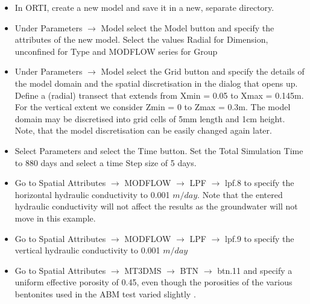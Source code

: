 \begin{itemize}

\item In ORTI, create a new model and save it in a new, separate directory.

\item Under {\color{blue}Parameters} $\rightarrow$ {\color{blue}Model} select the {\color{blue}Model} button and specify the attributes of the new model. Select the values {\color{blue}Radial} for {\color{blue}Dimension}, {\color{blue}unconfined} for {\color{blue}Type} 
and {\color{blue}MODFLOW series} for {\color{blue}Group} 

\item Under {\color{blue}Parameters} $\rightarrow$ {\color{blue}Model} select the {\color{blue}Grid} button and specify the details of the model domain and the spatial discretisation in the dialog that opens up. 
Define a (radial) transect that extends from Xmin = 0.05 to Xmax = 0.145m. 
For the vertical extent we consider Zmin = 0 to Zmax = 0.3m.  
The model domain may be discretised into grid cells of 5mm length and 1cm height. 
Note, that the model discretisation can be easily changed again later. 

\item Select {\color{blue}Parameters} and select the {\color{blue}Time} button.
Set the {\color{blue}Total Simulation Time} to 880 days and select a time {\color{blue}Step size}
of 5 days. 

\item Go to {\color{blue}Spatial Attributes} $\rightarrow$ {\color{blue}MODFLOW} $\rightarrow$ {\color{blue}LPF} $\rightarrow$ {\color{blue}lpf.8} to specify the horizontal hydraulic conductivity to 0.001 $m/day$.
Note that the entered hydraulic conductivity will not affect the results as the groundwater will not move
in this example. 

\item Go to {\color{blue}Spatial Attributes} $\rightarrow$ {\color{blue}MODFLOW} $\rightarrow$ {\color{blue}LPF} $\rightarrow$ {\color{blue}lpf.9} to specify the vertical hydraulic conductivity to 0.001 $m/day$

\item Go to {\color{blue}Spatial Attributes} $\rightarrow$ {\color{blue}MT3DMS} $\rightarrow$ {\color{blue}BTN} $\rightarrow$ {\color{blue}btn.11} and specify a uniform effective porosity of 0.45, even though the 
porosities of the various bentonites used in the ABM test varied slightly \citep{wallis_2016}.   



\end{itemize}
